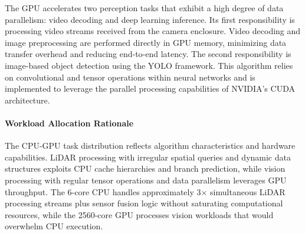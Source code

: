 

The GPU accelerates two perception tasks that exhibit a high degree of data parallelism: video decoding and deep learning inference.
Its first responsibility is processing video streams received from the camera enclosure. 
Video decoding and image preprocessing are performed directly in GPU memory, minimizing data transfer overhead and reducing end-to-end latency.
The second responsibility is image-based object detection using the \ac{YOLO} framework. 
This algorithm relies on convolutional and tensor operations within neural networks and is implemented to leverage the parallel processing capabilities of NVIDIA’s CUDA architecture.

\paragraph{Workload Allocation Rationale}

The CPU-GPU task distribution reflects algorithm characteristics and hardware capabilities.
LiDAR processing with irregular spatial queries and dynamic data structures exploits CPU cache hierarchies and branch prediction, while vision processing with regular tensor operations and data parallelism leverages GPU throughput.
The 6-core CPU handles approximately 3× simultaneous LiDAR processing streams plus sensor fusion logic without saturating computational resources, while the 2560-core GPU processes vision workloads that would overwhelm CPU execution.

